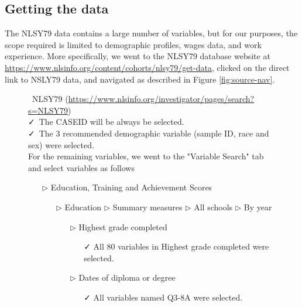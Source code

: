 \documentclass[12pt]{article}
\begin{document}
\hypertarget{getdata}{%
\subsection{Getting the data}\label{getdata}}

The NLSY79 data contains a large number of variables, but for our purposes, the scope required is limited to demographic profiles, wages data, and work experience. More specifically, we went to the NLSY79 database website at \url{https://www.nlsinfo.org/content/cohorts/nlsy79/get-data}, clicked on the direct link to NSLY79 data, and navigated as described in Figure \ref{fig:source-nav}.

\begin{figure}[t]

\begin{tcolorbox}[title = Navigating the data source]
\faDatabase\ NLSY79 (\url{https://www.nlsinfo.org/investigator/pages/search?s=NLSY79})\\
\vspace{1mm}
\faCheck\ The CASEID will be always be selected.  \\
\vspace{1mm}
\faCheck\ The 3 recommended demographic variable (sample ID, race and sex) were selected.  \\
\vspace{1mm}
For the remaining variables, we went to the "Variable Search" tab and select variables as follows
\begin{itemize}
\item[$\triangleright$] Education, Training and Achievement Scores
\begin{itemize}
\item[$\triangleright$] Education $\triangleright$ Summary measures $\triangleright$ All schools $\triangleright$ By year
\begin{itemize}
\item[$\triangleright$] Highest grade completed
\begin{itemize}
\item[\faCheck] All 80 variables in Highest grade completed were selected.
\end{itemize}
\end{itemize}
\begin{itemize}
\item[$\triangleright$] Dates of diploma or degree
\begin{itemize}
\item[\faCheck] All variables named Q3-8A were selected.

\end{itemize}
\end{itemize}
\end{itemize}
\end{itemize}
\end{tcolorbox}
\end{figure}
\end{document}
